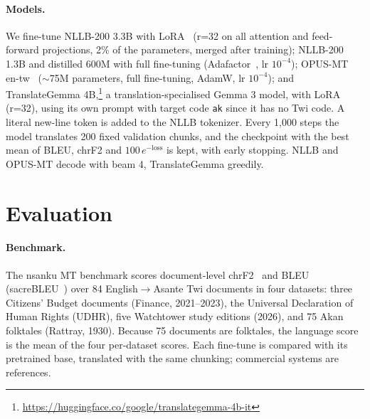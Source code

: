 \documentclass[10pt,twocolumn]{article}
\begin{document}
\paragraph{Models.} We fine-tune NLLB-200 3.3B with LoRA~\cite{hu2022lora} (r=32 on all attention and feed-forward projections, 2\% of the parameters, merged after training); NLLB-200 1.3B and distilled 600M with full fine-tuning (Adafactor~\cite{shazeer2018adafactor}, lr $10^{-4}$); OPUS-MT en-tw~\cite{tiedemann2020opus} ($\sim$75M parameters, full fine-tuning, AdamW, lr $10^{-4}$); and TranslateGemma 4B,\footnote{\url{https://huggingface.co/google/translategemma-4b-it}} a translation-specialised Gemma 3 model, with LoRA (r=32), using its own prompt with target code \texttt{ak} since it has no Twi code. A literal new-line token is added to the NLLB tokenizer. Every 1,000 steps the model translates 200 fixed validation chunks, and the checkpoint with the best mean of BLEU, chrF2 and $100\,e^{-\mathrm{loss}}$ is kept, with early stopping. NLLB and OPUS-MT decode with beam 4, TranslateGemma greedily.

\section{Evaluation}

\paragraph{Benchmark.} The nsanku MT benchmark scores document-level chrF2~\cite{popovic2015chrf} and BLEU~\cite{papineni2002bleu} (sacreBLEU~\cite{post2018call}) over 84 English$\rightarrow$Asante Twi documents in four datasets: three Citizens' Budget documents (Finance, 2021--2023), the Universal Declaration of Human Rights (UDHR), five Watchtower study editions (2026), and 75 Akan folktales (Rattray, 1930). Because 75 documents are folktales, the language score is the mean of the four per-dataset scores. Each fine-tune is compared with its pretrained base, translated with the same chunking; commercial systems are references.
\end{document}
